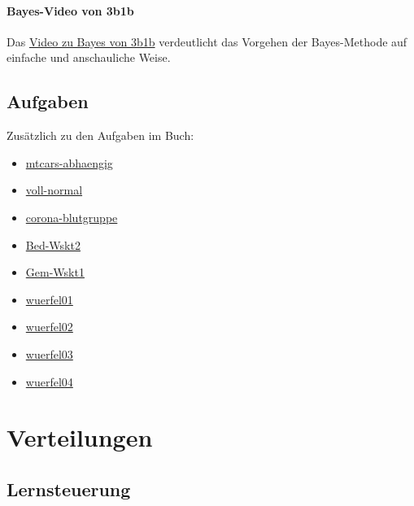 \documentclass[
  a4paper,
  DIV=11]{scrreprt}
\providecommand{\tightlist}{%
  \setlength{\itemsep}{0pt}\setlength{\parskip}{0pt}}\usepackage{longtable,booktabs,array}
\theoremstyle{definition}
\theoremstyle{remark}
\begin{document}
\hypertarget{bayes-video-von-3b1b}{%
\subsubsection{Bayes-Video von 3b1b}\label{bayes-video-von-3b1b}}

Das \href{https://youtu.be/HZGCoVF3YvM}{Video zu Bayes von 3b1b}
verdeutlicht das Vorgehen der Bayes-Methode auf einfache und
anschauliche Weise.

\hypertarget{aufgaben-1}{%
\section{Aufgaben}\label{aufgaben-1}}

Zusätzlich zu den Aufgaben im Buch:

\begin{itemize}
\tightlist
\item
  \href{https://datenwerk.netlify.app/posts/mtcars-abhaengig/mtcars-abhaengig.html}{mtcars-abhaengig}
\item
  \href{https://datenwerk.netlify.app/posts/voll-normal/voll-normal.html}{voll-normal}
\item
  \href{https://datenwerk.netlify.app/posts/corona-blutgruppe/corona-blutgruppe.html}{corona-blutgruppe}
\item
  \href{https://datenwerk.netlify.app/posts/bed-wskt2/bed-wskt2}{Bed-Wskt2}
\item
  \href{https://datenwerk.netlify.app/posts/gem-wskt1/gem-wskt1}{Gem-Wskt1}
\item
  \href{https://datenwerk.netlify.app/posts/wuerfel01/wuerfel01.html}{wuerfel01}
\item
  \href{https://datenwerk.netlify.app/posts/wuerfel02/wuerfel02.html}{wuerfel02}
\item
  \href{https://datenwerk.netlify.app/posts/wuerfel03/wuerfel03.html}{wuerfel03}
\item
  \href{https://datenwerk.netlify.app/posts/wuerfel04/wuerfel04.html}{wuerfel04}
\end{itemize}


\hypertarget{verteilungen}{%
\chapter{Verteilungen}\label{verteilungen}}

\hypertarget{lernsteuerung-2}{%
\section{Lernsteuerung}\label{lernsteuerung-2}}
\end{document}
